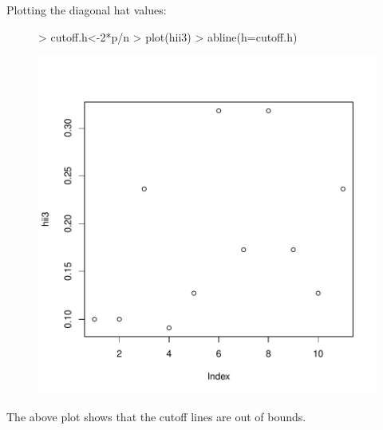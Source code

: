 \documentclass[12pt]{article}
\begin{document}
\begin{itemize}
Plotting the  diagonal hat values:
\begin{figure}[H]
\begin{Schunk}
\begin{Sinput}
> cutoff.h<-2*p/n
> plot(hii3)
> abline(h=cutoff.h)
\end{Sinput}
\end{Schunk}
\includegraphics{HW6-024}
\end{figure}
The above plot shows that the cutoff lines are out of bounds.
\clearpage


\end{itemize}
\end{document}
